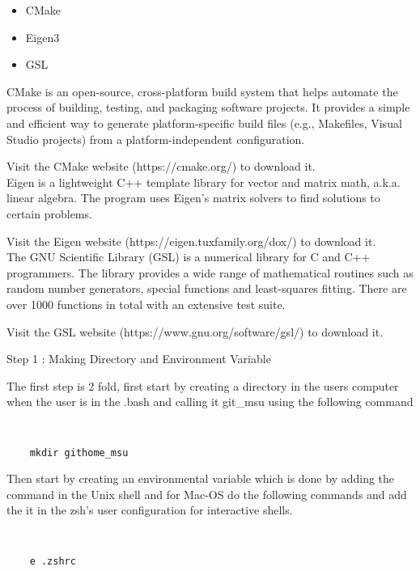 \documentclass[12pt]{article}
\numberwithin{equation}{section}
\numberwithin{figure}{section}
\begin{document}
\begin{itemize}
    \item CMake
    \item Eigen3
    \item GSL
\end{itemize}

CMake is an open-source, cross-platform build system that helps automate the process of building, testing, and packaging software projects. It provides a simple and efficient way to generate platform-specific build files (e.g., Makefiles, Visual Studio projects) from a platform-independent configuration.

Visit the CMake website (https://cmake.org/) to download it.\\

Eigen is a lightweight C++ template library for vector and matrix math, a.k.a. linear algebra. The program uses Eigen's matrix solvers to find solutions to certain problems.

Visit the Eigen website (https://eigen.tuxfamily.org/dox/) to download it.\\

The GNU Scientific Library (GSL) is a numerical library for C and C++ programmers. The library provides a wide range of mathematical routines such as random number generators, special functions and least-squares fitting. There are over 1000 functions in total with an extensive test suite.

Visit the GSL website (https://www.gnu.org/software/gsl/) to download it.\\

\begin{description}
\item[Step 1 : Making Directory and Environment Variable]
\end{description}

The first step is 2 fold, first start by creating a directory in the users computer when the user is in the .bash and calling it git\_msu using the following command 

{\tt 
\begin{verbatim}
    mkdir githome_msu 
\end{verbatim}
}

Then start by creating an environmental variable which is done by adding the command in the Unix shell and for Mac-OS do the following commands and add the it in the zsh's user configuration for interactive shells.  

{\tt 
\begin{verbatim}
    e .zshrc
\end{verbatim}
}
\end{document}
